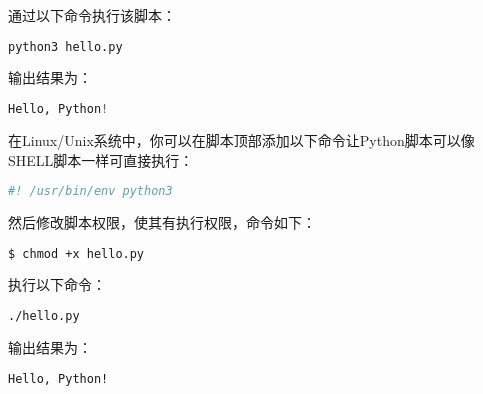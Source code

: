 通过以下命令执行该脚本：

\begin{lstlisting}[language=bash]
python3 hello.py
\end{lstlisting}

输出结果为：

\begin{lstlisting}[language=python]
Hello, Python!
\end{lstlisting}

在Linux/Unix系统中，你可以在脚本顶部添加以下命令让Python脚本可以像SHELL脚本一样可直接执行：

\begin{lstlisting}[language=python]
#! /usr/bin/env python3
\end{lstlisting}

然后修改脚本权限，使其有执行权限，命令如下：

\begin{lstlisting}[language=bash]
$ chmod +x hello.py
\end{lstlisting}

执行以下命令：

\begin{lstlisting}[language=bash]
./hello.py
\end{lstlisting}

输出结果为：

\begin{lstlisting}[language=bash]
Hello, Python!
\end{lstlisting}
